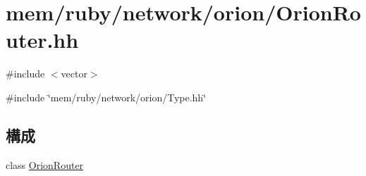 \hypertarget{OrionRouter_8hh}{
\section{mem/ruby/network/orion/OrionRouter.hh}
\label{OrionRouter_8hh}
}
{\ttfamily \#include $<$vector$>$}\par
{\ttfamily \#include \char`\"{}mem/ruby/network/orion/Type.hh\char`\"{}}\par
\subsection*{構成}
\begin{DoxyCompactItemize}
\item 
class \hyperlink{classOrionRouter}{OrionRouter}
\end{DoxyCompactItemize}
